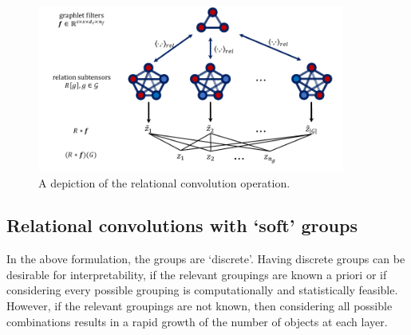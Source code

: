 \begin{figure}
    \vskip-10pt
    \centering
    \includegraphics[width=0.9\textwidth]{figs/relconv_diagram2.pdf}
    \vskip-10pt
    \caption{A depiction of the relational convolution operation.
    }\label{fig:relconvdiagram}
    \vskip -10pt
\end{figure}

\subsection{Relational convolutions with `soft' groups}

In the above formulation, the groups are `discrete'. Having discrete groups can be desirable for interpretability, if the relevant groupings are known a priori or if considering every possible grouping is computationally and statistically feasible. However, if the relevant groupings are not known, then considering all possible combinations results in a rapid growth of the number of objects at each layer.


